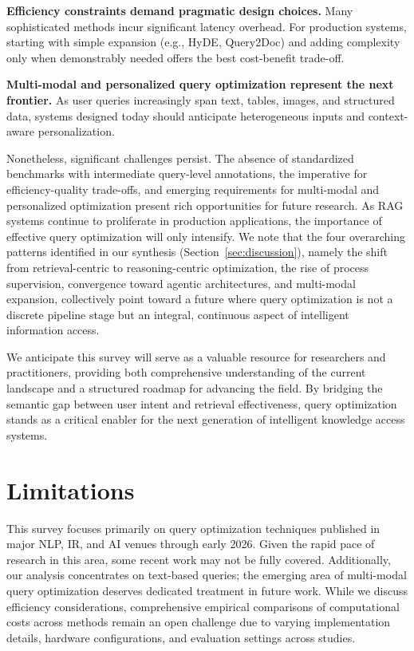 \documentclass{article}
\begin{document}
\textbf{Efficiency constraints demand pragmatic design choices.} Many sophisticated methods incur significant latency overhead. For production systems, starting with simple expansion (e.g., HyDE, Query2Doc) and adding complexity only when demonstrably needed offers the best cost-benefit trade-off.

\textbf{Multi-modal and personalized query optimization represent the next frontier.} As user queries increasingly span text, tables, images, and structured data, systems designed today should anticipate heterogeneous inputs and context-aware personalization.

Nonetheless, significant challenges persist. The absence of standardized benchmarks with intermediate query-level annotations, the imperative for efficiency-quality trade-offs, and emerging requirements for multi-modal and personalized optimization present rich opportunities for future research. As RAG systems continue to proliferate in production applications, the importance of effective query optimization will only intensify. We note that the four overarching patterns identified in our synthesis (Section~\ref{sec:discussion}), namely the shift from retrieval-centric to reasoning-centric optimization, the rise of process supervision, convergence toward agentic architectures, and multi-modal expansion, collectively point toward a future where query optimization is not a discrete pipeline stage but an integral, continuous aspect of intelligent information access.

We anticipate this survey will serve as a valuable resource for researchers and practitioners, providing both comprehensive understanding of the current landscape and a structured roadmap for advancing the field. By bridging the semantic gap between user intent and retrieval effectiveness, query optimization stands as a critical enabler for the next generation of intelligent knowledge access systems.

\section*{Limitations}

This survey focuses primarily on query optimization techniques published in major NLP, IR, and AI venues through early 2026. Given the rapid pace of research in this area, some recent work may not be fully covered. Additionally, our analysis concentrates on text-based queries; the emerging area of multi-modal query optimization deserves dedicated treatment in future work. While we discuss efficiency considerations, comprehensive empirical comparisons of computational costs across methods remain an open challenge due to varying implementation details, hardware configurations, and evaluation settings across studies.



\end{document}
